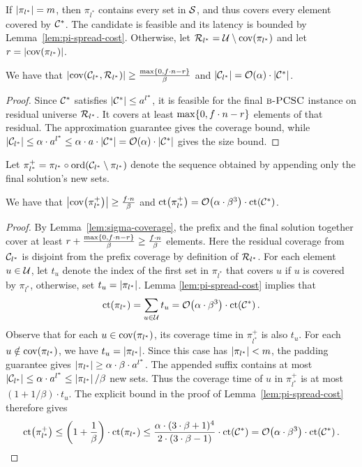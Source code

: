    If $\mathopen{}\left| \pi_{l^*} \right|=m$, then $\pi_{l^*}$ contains every set in $\mathcal{S}$, and thus covers every element covered by $\mathcal{C}^{*}$. The candidate is feasible and its latency is bounded by Lemma~\ref{lem:pi-spread-cost}. Otherwise, let $\mathcal{R}_{l^*}=\mathcal{U}\setminus\operatorname{cov}\mathopen{}\left( \pi_{l^*} \right)$ and let $r=\mathopen{}\left| \operatorname{cov}\mathopen{}\left( \pi_{l^*} \right) \right|$.
    \begin{lemma}\label{lem:sigma-coverage}
        We have that $\mathopen{}\left| \operatorname{cov}\mathopen{}\left( \mathcal{C}_{l^*},\mathcal{R}_{l^*} \right) \right| \geq \frac{\max\mathopen{}\left\{ 0,f\cdot n-r \right\}}{\beta}$ and $\mathopen{}\left| \mathcal{C}_{l^*} \right| = \mathcal{O}\mathopen{}\left( \alpha \right)\cdot \mathopen{}\left| \mathcal{C}^{*} \right|$.
    \end{lemma}
    \begin{proof}
        Since $\mathcal{C}^{*}$ satisfies $\mathopen{}\left| \mathcal{C}^{*} \right|\leq a^{l^*}$, it is feasible for the final $\textup{\textsc{b-PCSC}}$ instance on residual universe $\mathcal{R}_{l^*}$. It covers at least $\max\mathopen{}\left\{ 0,f\cdot n-r \right\}$ elements of that residual. The approximation guarantee gives the coverage bound, while $\mathopen{}\left| \mathcal{C}_{l^*} \right|\leq\alpha\cdot a^{l^*}\leq\alpha\cdot a\cdot\mathopen{}\left| \mathcal{C}^{*} \right|=\mathcal{O}\mathopen{}\left( \alpha \right)\cdot\mathopen{}\left| \mathcal{C}^{*} \right|$ gives the size bound.
    \end{proof}
    Let $\pi_{l^*}^+=\pi_{l^*}\circ\operatorname{ord}\mathopen{}\left( \mathcal{C}_{l^*}\setminus \pi_{l^*} \right)$ denote the sequence obtained by appending only the final solution's new sets.
    \begin{lemma}\label{lem:combined-coverage-cost}
        We have that $\mathopen{}\left| \operatorname{cov}\mathopen{}\left( \pi_{l^*}^+ \right) \right|\geq \frac{f\cdot n}{\beta}$ and $\operatorname{ct}\mathopen{}\left( \pi_{l^*}^+ \right) = \mathcal{O}\mathopen{}\left( \alpha\cdot\beta^3 \right)\cdot \operatorname{ct}\mathopen{}\left( \mathcal{C}^{*} \right)$.
    \end{lemma}
    \begin{proof}
        By Lemma~\ref{lem:sigma-coverage}, the prefix and the final solution together cover at least $r+\frac{\max\mathopen{}\left\{ 0,f\cdot n-r \right\}}{\beta}\geq\frac{f\cdot n}{\beta}$ elements. Here the residual coverage from $\mathcal{C}_{l^*}$ is disjoint from the prefix coverage by definition of $\mathcal{R}_{l^*}$.
        For each element $u\in\mathcal{U}$, let $t_u$ denote the index of the first set in $\pi_{l^*}$ that covers $u$ if $u$ is covered by $\pi_{l^*}$, otherwise, set $t_u=\mathopen{}\left| \pi_{l^*} \right|$.
        Lemma \ref{lem:pi-spread-cost} implies that 
        \[
        \operatorname{ct}\mathopen{}\left( \pi_{l^*} \right)=\sum_{u\in\mathcal{U}} t_u = \mathcal{O}\mathopen{}\left( \alpha\cdot\beta^3 \right)\cdot \operatorname{ct}\mathopen{}\left( \mathcal{C}^{*} \right).
        \]
        Observe that for each $u\in\operatorname{cov}\mathopen{}\left( \pi_{l^*} \right)$, its coverage time in $\pi_{l^*}^+$ is also $t_u$.
        For each $u\notin\operatorname{cov}\mathopen{}\left( \pi_{l^*} \right)$, we have $t_u=\mathopen{}\left| \pi_{l^*} \right|$. Since this case has $\mathopen{}\left| \pi_{l^*} \right|<m$, the padding guarantee gives $\mathopen{}\left| \pi_{l^*} \right|\geq\alpha\cdot\beta\cdot a^{l^*}$. The appended suffix contains at most $\mathopen{}\left| \mathcal{C}_{l^*} \right|\leq\alpha\cdot a^{l^*}\leq\mathopen{}\left| \pi_{l^*} \right|/\beta$ new sets. Thus the coverage time of $u$ in $\pi_{l^*}^+$ is at most $(1+1/\beta)\cdot t_u$.
        The explicit bound in the proof of Lemma~\ref{lem:pi-spread-cost} therefore gives
        \[
        \operatorname{ct}\mathopen{}\left( \pi_{l^*}^+ \right)
        \leq\mathopen{}\left( 1+\frac{1}{\beta} \right)\cdot\operatorname{ct}\mathopen{}\left( \pi_{l^*} \right)
        \leq\frac{\alpha\cdot(3\cdot\beta+1)^4}{2\cdot(3\cdot\beta-1)}\cdot\operatorname{ct}\mathopen{}\left( \mathcal{C}^{*} \right)
        =\mathcal{O}\mathopen{}\left( \alpha\cdot\beta^3 \right)\cdot\operatorname{ct}\mathopen{}\left( \mathcal{C}^{*} \right).
        \]
    \end{proof}
